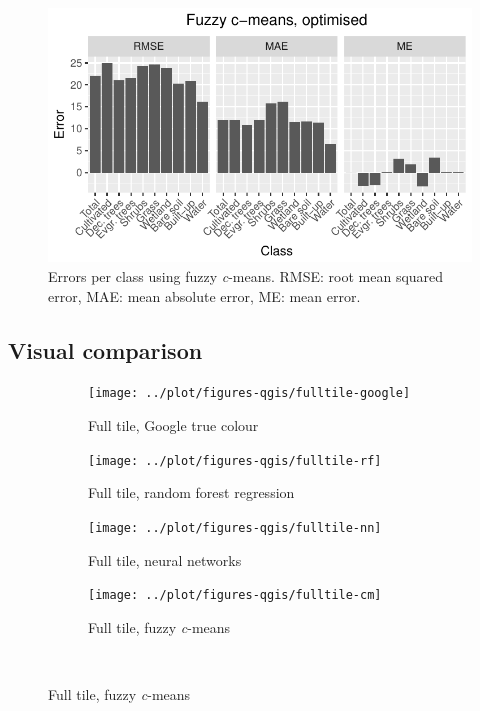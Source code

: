 \documentclass[a4paper,10pt]{book}
\begin{document}
\begin{figure}
  \centering
  \includegraphics[width=\textwidth]{../plot/perclass-errors-cm}
  \caption{Errors per class using fuzzy \textit{c}-means. RMSE: root mean squared error, MAE: mean absolute error, ME: mean error.}
  \label{fig-perclass-errors-cm}
\end{figure}

\subsection{Visual comparison}

\begin{figure}
  \centering
  \begin{subfigure}[b]{.23\textwidth}
    \texttt{[image: ../plot/figures-qgis/fulltile-google]}
    \caption{Full tile, Google true colour}
  \end{subfigure} \hfill
  \begin{subfigure}[b]{.23\textwidth}
    \texttt{[image: ../plot/figures-qgis/fulltile-rf]}
    \caption{Full tile, random forest regression}
    \label{subfig-fulltile-rf}
  \end{subfigure} \hfill
  \begin{subfigure}[b]{.23\textwidth}
    \texttt{[image: ../plot/figures-qgis/fulltile-nn]}
    \caption{Full tile, neural networks}
  \end{subfigure} \hfill
  \begin{subfigure}[b]{.23\textwidth}
    \texttt{[image: ../plot/figures-qgis/fulltile-cm]}
    \caption{Full tile, fuzzy \textit{c}-means}
    \label{subfig-fulltile-cm}
  \end{subfigure} \
\end{figure}
\end{document}

